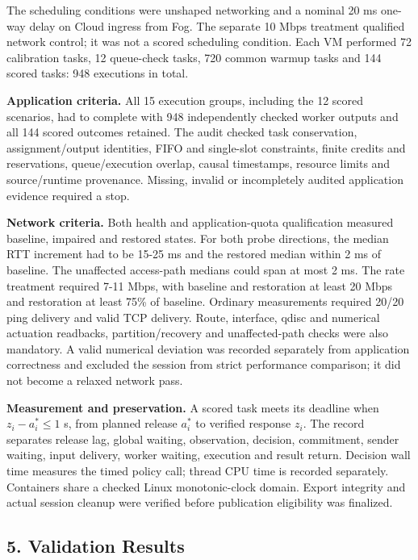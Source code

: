 \documentclass[11pt,a4paper]{article}
\begin{document}
The scheduling conditions were unshaped networking and a nominal 20 ms
one-way delay on Cloud ingress from Fog. The separate 10 Mbps treatment
qualified network control; it was not a scored scheduling condition.
Each VM performed 72 calibration tasks, 12 queue-check tasks, 720 common
warmup tasks and 144 scored tasks: 948 executions in total.

\textbf{Application criteria.} All 15 execution groups, including the 12
scored scenarios, had to complete with 948 independently checked worker
outputs and all 144 scored outcomes retained. The audit checked task
conservation, assignment/output identities, FIFO and single-slot
constraints, finite credits and reservations, queue/execution overlap,
causal timestamps, resource limits and source/runtime provenance.
Missing, invalid or incompletely audited application evidence required a
stop.

\textbf{Network criteria.} Both health and application-quota
qualification measured baseline, impaired and restored states. For both
probe directions, the median RTT increment had to be 15-25 ms and the
restored median within 2 ms of baseline. The unaffected access-path
medians could span at most 2 ms. The rate treatment required 7-11 Mbps,
with baseline and restoration at least 20 Mbps and restoration at least
75\% of baseline. Ordinary measurements required 20/20 ping delivery and
valid TCP delivery. Route, interface, qdisc and numerical actuation
readbacks, partition/recovery and unaffected-path checks were also
mandatory. A valid numerical deviation was recorded separately from
application correctness and excluded the session from strict performance
comparison; it did not become a relaxed network pass.

\textbf{Measurement and preservation.} A scored task meets its deadline
when \(z_i-a_i^*\leq1\) s, from planned release \(a_i^*\) to verified
response \(z_i\). The record separates release lag, global waiting,
observation, decision, commitment, sender waiting, input delivery,
worker waiting, execution and result return. Decision wall time measures
the timed policy call; thread CPU time is recorded separately.
Containers share a checked Linux monotonic-clock domain. Export
integrity and actual session cleanup were verified before publication
eligibility was finalized.

\Needspace{200pt}

\subsection{5. Validation Results}\label{validation-results}
\end{document}
